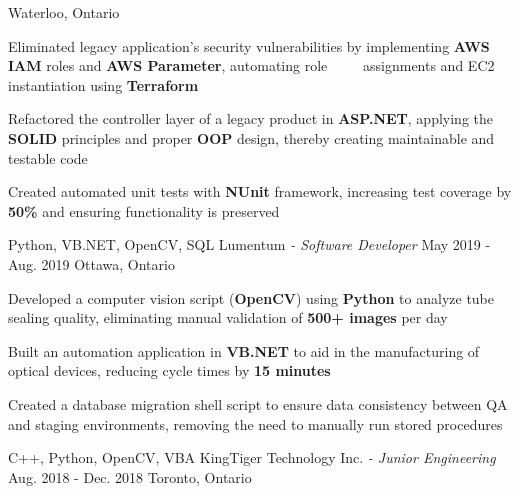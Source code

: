 \begin{siderules}
\begin{cventries}
    {Waterloo, Ontario}
    {
      \begin{cvitems}
        \item {Eliminated legacy application’s security vulnerabilities by implementing \textbf{AWS IAM} roles and \textbf{AWS Parameter}, automating role $\>$ $\>$ $\>$ $\>$ assignments and EC2 instantiation using \textbf{Terraform}}
        \item {Refactored the controller layer of a legacy product in \textbf{ASP.NET}, applying the \textbf{SOLID} principles and proper \textbf{OOP} design, thereby creating maintainable and testable code}
        \item {Created automated unit tests with \textbf{NUnit} framework, increasing test coverage by \textbf{50\%} and ensuring functionality is preserved}
      \end{cvitems}
    }
    \cventry
      {Python, VB.NET, OpenCV, SQL}
      {Lumentum\hspace{0.15em} \bodyfontlight\itshape{- Software Developer}}
      {May 2019 - Aug. 2019}
      {Ottawa, Ontario}
      {
        \begin{cvitems}
          \item {Developed a computer vision script (\textbf{OpenCV}) using \textbf{Python} to analyze tube sealing quality, eliminating manual validation of \textbf{500+ images} per day}
          \item {Built an automation application in \textbf{VB.NET} to aid in the manufacturing of optical devices, reducing cycle times by \textbf{15 minutes}}
          \item {Created a database migration shell script to ensure data consistency between QA and staging environments, removing the need to manually run stored procedures}
        \end{cvitems}
      }
    \cventry
      {C++, Python, OpenCV, VBA}
      {KingTiger Technology Inc.\hspace{0.15em} \bodyfontlight\itshape{- Junior Engineering}}
      {Aug. 2018 - Dec. 2018}
      {Toronto, Ontario}
      {
        \begin{cvitems}

\end{cvitems}}
\end{cventries}
\end{siderules}
